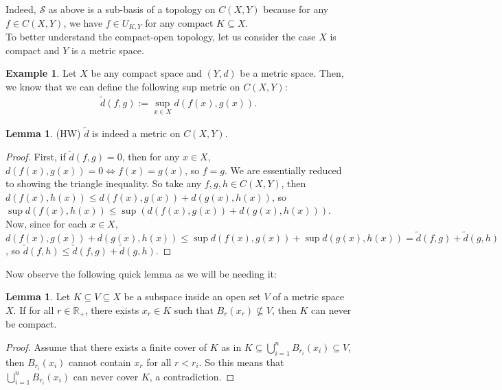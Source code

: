 \documentclass[letterpaper,11pt,twoside]{article}
\theoremstyle{definition}
\theoremstyle{definition}
\theoremstyle{definition}
\theoremstyle{definition}
\newtheorem{lemma}[proposition]{\textbf{Lemma}}
\theoremstyle{definition}
\newtheorem*{example}{\textbf{Example}}
\theoremstyle{definition}
\theoremstyle{remark}
\theoremstyle{definition}
\newcommand{\R}[0]{\mathbb{R}}
\newcommand{\bunion}[0]{\bigcup}
\begin{document}
Indeed, $\mathcal{S}$ as above is a sub-basis of a topology on $C(X,Y)$ because for any $f\in C(X,Y)$, we have $f\in U_{K,Y}$ for any compact $K \subseteq X$.\\

To better understand the compact-open topology, let us consider the case $X$ is compact and $Y$ is a metric space.
\begin{example}
    Let $X$ be any compact space and $(Y,d)$ be a metric space. Then, we know that we can define the following sup metric on $C(X,Y)$:
    \begin{align*}
        \tilde{d}(f,g) := \sup_{x\in X} d(f(x),g(x)).
    \end{align*}
    \begin{lemma}(HW)
    $\tilde{d}$ is indeed a metric on $C(X,Y)$.
    \end{lemma}
    \begin{proof}
        First, if $\tilde{d}(f,g) = 0$, then for any $x\in X$, $d(f(x),g(x))= 0 \iff f(x) = g(x)$, so $f = g$. We are essentially reduced to showing the triangle inequality. So take any $f,g,h \in C(X,Y)$, then $d(f(x),h(x)) \le d(f(x),g(x))+ d(g(x),h(x))$, so $\sup d(f(x),h(x)) \le \sup\left (d(f(x),g(x))+ d(g(x),h(x))\right)$. Now, since for each $x\in X$, $ d(f(x),g(x))+ d(g(x),h(x)) \le \sup  d(f(x),g(x))+ \sup d(g(x),h(x)) = \tilde{d}(f,g) + \tilde{d}(g,h)$, so $\tilde{d}(f,h) \le \tilde{d}(f,g) + \tilde{d}(g,h)$. 
    \end{proof} 
    Now observe the following quick lemma as we will be needing it:
    \begin{lemma}\label{L-2.0.3}
    Let $K\subseteq V\subseteq X$ be a subspace inside an open set $V$ of a metric space $X$. If for all $r\in \R_+$, there exists $x_r\in K$ such that $B_r(x_r) \not\subseteq V $, then $K$ can never be compact.
    \end{lemma}
    \begin{proof}
        Assume that there exists a finite cover of $K$ as in $K \subseteq \bunion_{i=1}^n B_{r_i}(x_i) \subseteq V$, then $B_{r_i}(x_i)$ cannot contain $x_r$ for all $r<r_i$. So this means that $\bunion_{i=1}^n B_{r_i}(x_i)$ can never cover $K$, a contradiction.
    \end{proof} 

\end{example}
\end{document}
